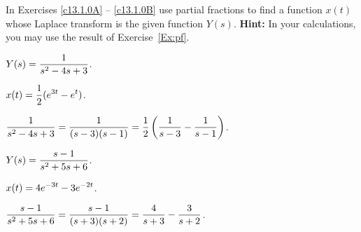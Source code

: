 \documentclass{ximera}
\begin{document}
\noindent In Exercises \ref{c13.1.0A} -- \ref{c13.1.0B} use partial fractions
to find a function $x(t)$ whose Laplace transform is the given function
$Y(s)$.  {\bf Hint:}  In your calculations, you may use the result of 
Exercise~\ref{Ex:pf}.
\begin{exercise} \label{c13.1.0A}
$Y(s) = \displaystyle\frac{1}{s^2-4s+3}$.

\begin{solution}
\ans $\displaystyle x(t) = \frac{1}{2}(e^{3t}-e^t)$.

\soln $\displaystyle\frac{1}{s^2-4s+3} = \frac{1}{(s-3)(s-1)} =
\frac{1}{2}\left(\frac{1}{s-3} - \frac{1}{s-1}\right)$.


\end{solution}
\end{exercise}
\begin{exercise} \label{c13.1.0B}
$Y(s) = \displaystyle\frac{s-1}{s^2+5s+6}$.

\begin{solution}
\ans $\displaystyle x(t) = 4e^{-3t}-3e^{-2t}$.

\soln $\displaystyle\frac{s-1}{s^2+5s+6} = \frac{s-1}{(s+3)(s+2)} =
\frac{4}{s+3} - \frac{3}{s+2}$.

\end{solution}
\end{exercise}
\end{document}
